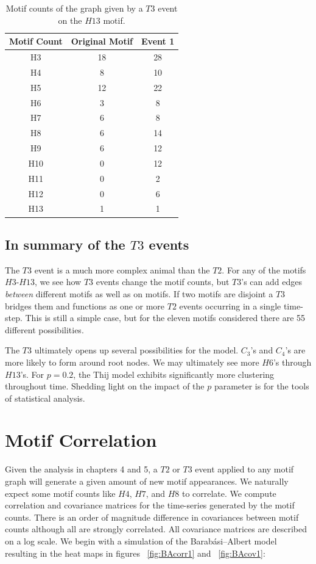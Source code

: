\begin{table}
    \centering
    \begin{tabular}{||c c c||} 
    \hline
    Motif Count & Original Motif & Event 1\\ [0.5ex] 
    \hline\hline
    H3 & 18 & 28 \\ 
    \hline
    H4 & 8 & 10 \\
    \hline
    H5 & 12 & 22 \\
    \hline
    H6 & 3 & 8 \\
    \hline
    H7 & 6 & 8 \\
    \hline
    H8 & 6 & 14 \\
    \hline
    H9 & 6 & 12 \\
    \hline
    H10 & 0 & 12 \\
    \hline
    H11 & 0 & 2 \\
    \hline
    H12 & 0 & 6 \\
    \hline
    H13 & 1 & 1\\
    \hline
   \end{tabular}
   \caption{Motif counts of the graph given by a $T3$ event on the $H13$ motif.}
   \label{table:22}
\end{table}


\section{In summary of the $T3$ events}

The $T3$ event is a much more complex animal than the $T2$. For any of the motifs $H3$-$H13$,
 we see how $T3$ events change the motif counts, but 
$T3$'s can add edges \textit{between} different motifs as well as on motifs. If two motifs
are disjoint a $T3$ bridges them and functions as one or more $T2$ events occurring in a single 
time-step. This is still a simple case, but for the eleven motifs considered there are 
55 different possibilities. 

The $T3$ ultimately opens up several possibilities for the model. $C_3$'s and $C_4$'s
are more likely to form around root nodes. We may ultimately see more 
$H6$'s through $H13$'s. For $p=0.2$, the
 Thij model exhibits significantly more clustering throughout time. Shedding light on the impact of the $p$
parameter is for the tools of statistical analysis.


\chapter{Motif Correlation}
Given the analysis in chapters 4 and 5, a $T2$ or $T3$ event applied to any motif graph will generate a given amount of
new motif appearances. We naturally expect some motif counts like $H4$, $H7$, and $H8$ to correlate. We
 compute correlation and covariance matrices for the time-series generated by the motif counts. There is an order of magnitude difference in covariances between
motif counts although all are strongly correlated. All covariance matrices are described on a log scale.
 We begin with a simulation of the Barabási–Albert model
resulting in the heat maps in figures ~\ref{fig:BAcorr1} and ~\ref{fig:BAcov1}:


